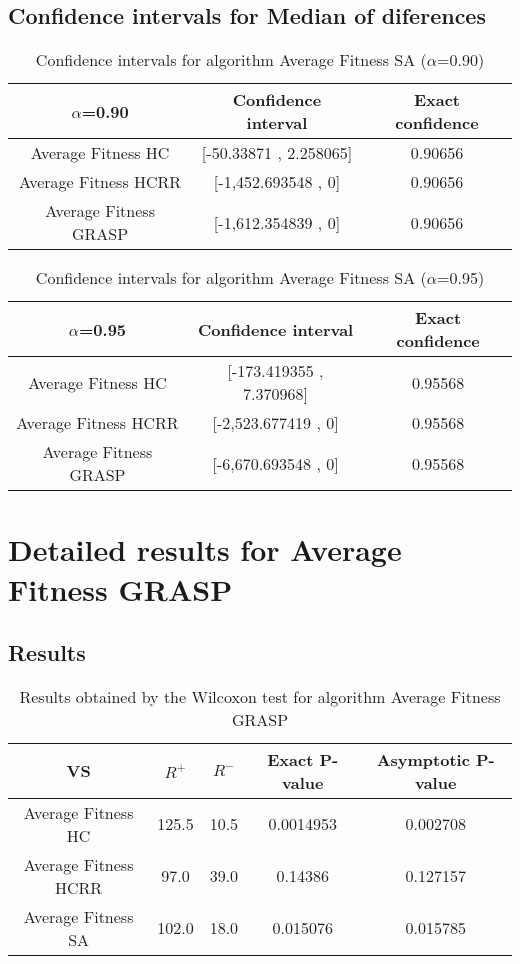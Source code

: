 \documentclass[a4paper,10pt]{article}
\begin{document}
\subsection{Confidence intervals for Median of diferences}

\begin{table}[!htp]
\centering\small
\begin{tabular}{
|c|c|c|}
\hline
 $\alpha$=0.90 & Confidence interval & Exact confidence \\ \hline 
Average Fitness HC       & [-50.33871 , 2.258065] & 0.90656\\ \hline 
Average Fitness HCRR    & [-1,452.693548 , 0] & 0.90656\\ \hline 
Average Fitness GRASP & [-1,612.354839 , 0] & 0.90656\\ \hline 

\end{tabular}
\caption{Confidence intervals for algorithm Average Fitness SA      ($\alpha$=0.90)}
\end{table}
\begin{table}[!htp]
\centering\small
\begin{tabular}{
|c|c|c|}
\hline
 $\alpha$=0.95 & Confidence interval & Exact confidence \\ \hline 
Average Fitness HC       & [-173.419355 , 7.370968] & 0.95568\\ \hline 
Average Fitness HCRR    & [-2,523.677419 , 0] & 0.95568\\ \hline 
Average Fitness GRASP & [-6,670.693548 , 0] & 0.95568\\ \hline 

\end{tabular}
\caption{Confidence intervals for algorithm Average Fitness SA      ($\alpha$=0.95)}
\end{table}

 \clearpage 


\section{Detailed results for Average Fitness GRASP}


\subsection{Results}

\begin{table}[!htp]
\centering\small
\begin{tabular}{
|c|c|c|c|c|}
\hline
 VS & $R^{+}$ & $R^{-}$ & Exact P-value & Asymptotic P-value \\ \hline 
Average Fitness HC       & 125.5 & 10.5 & 0.0014953 & 0.002708\\ \hline 
Average Fitness HCRR    & 97.0 & 39.0 & 0.14386 & 0.127157\\ \hline 
Average Fitness SA      & 102.0 & 18.0 & 0.015076 & 0.015785\\ \hline 

\end{tabular}
\caption{Results obtained by the Wilcoxon test for algorithm Average Fitness GRASP}
\end{table}
\end{document}

